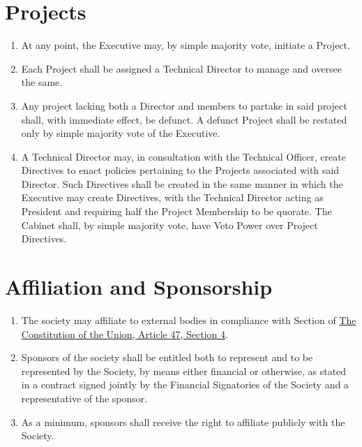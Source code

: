 \documentclass{scrartcl}
\begin{document}
    \clearpage
    \section{Projects}
        \label{project}
        \begin{enumerate}
            \item At any point, the Executive may, by simple majority vote, initiate a Project.
            \item Each Project shall be assigned a Technical Director to manage and oversee the same.
            \item Any project lacking both a Director and members to partake in said project shall, with immediate effect, be defunct.
                \subitem A defunct Project shall be restated only by simple majority vote of the Executive.
            \item A Technical Director may, in consultation with the Technical Officer, create Directives to enact policies pertaining to the Projects associated with said Director.
                \subitem Such Directives shall be created in the same manner in which the Executive may create Directives, with the Technical Director acting as President and requiring half the Project Membership to be quorate.
                \subitem The Cabinet shall, by simple majority vote, have Veto Power over Project Directives.
        \end{enumerate}

    \clearpage
    \section{Affiliation and Sponsorship}
        \label{affiliation}
        \begin{enumerate}
            \item The society may affiliate to external bodies in compliance with Section of \href{https://lancastersu.co.uk/resources/articles-of-association-2023/download_attachment}{The Constitution of the Union, Article 47, Section 4}.
            \item Sponsors of the society shall be entitled both to represent and to be represented by the Society, by means either financial or otherwise, as stated in a contract signed jointly by the Financial Signatories of the Society and a representative of the sponsor.
            \item As a minimum, sponsors shall receive the right to affiliate publicly with the Society.
        \end{enumerate}
\end{document}
